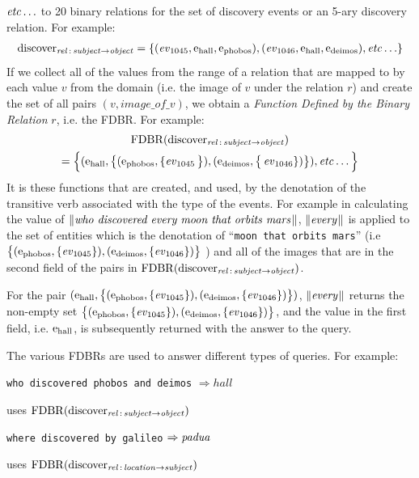 \documentclass[../main.tex]{subfiles}
\begin{document}
\begin{refsection}
\noindent $\etc$ to 20 binary relations for  the set of discovery events or an 5-ary discovery relation. For example:
\begin{multline*}
	\relationn{discover}{subject}{object} = \{(\event{1045}, \entity{hall}, \entity{phobos}), (\event{1046}, \entity{hall}, \entity{deimos}), \etc\}
\end{multline*}
If we collect all of the values from the range of a relation that are mapped to by each value $v$ from the domain (i.e. the image of $v$ under the relation $r$) and create the set of all pairs $(v, image\_of\_v)$, we obtain a {\em Function Defined by the Binary Relation} $r$, i.e. the FDBR. For example:
\begin{multline*}
	\FDBR{\relationn{discover}{subject}{object}} \\ = \Big\{ ( \entity{hall}, \big\{(\entity{phobos}, \{\event{1045}\big\}), (\entity{deimos}, \big\{\event{1046}\}) \big\}), \etc\Big\}
\end{multline*}
It is these functions that are created, and used, by the denotation of the transitive verb associated with the type of the events. For example in calculating the value of $\meaningof{who\ discovered\ every\ moon\ that\ orbits\ mars}$, $\meaningof{every}$ is applied to the set of entities which is the denotation of ``\texttt{moon that orbits mars}'' (i.e $\big\{ (\entity{phobos}, \{\event{1045}\}), \\ (\entity{deimos}, \{\event{1046}\})\big\}$ ) and all of the images that are in the second field of the pairs in $\FDBR{\relationn{discover}{subject}{object}}$.

For the pair $(\entity{hall}, \big\{(\entity{phobos}, \{\event{1045}\}), (\entity{deimos}, \{\event{1046}\})\big\})$, $\meaningof{every}$ returns the non-empty set $\big\{(\entity{phobos}, \{\event{1045}\}), (\entity{deimos}, \{\event{1046}\})\big\}$, and the value in the first field, i.e. $\entity{hall}$, is subsequently returned with the answer to the query.

The various FDBRs are used to answer different types of queries. For example:

\examplespacing

\texttt{who discovered phobos and deimos} $\Rightarrow hall$

\indent \indent uses $\FDBR{\relationn{discover}{subject}{object}}$

\texttt{where discovered by galileo} $\Rightarrow \opit{padua}$

\indent \indent uses $\FDBR{\relationn{discover}{location}{subject}}$


\end{refsection}
\end{document}

